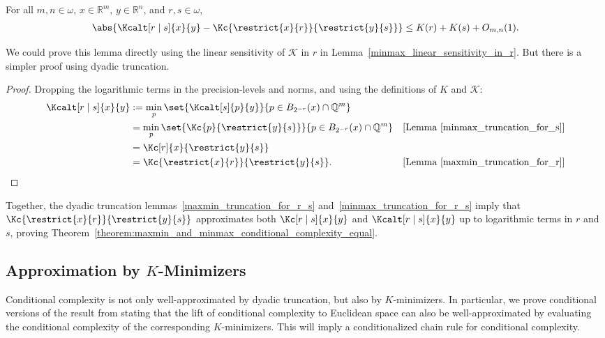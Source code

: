 \begin{lemma}
    \label{minmax_truncation_for_r_s}
    For all $m, n \in \omega$, $x \in \mathbb{R}^m$, $y \in \mathbb{R}^n$, and $r, s \in \omega$,
    \begin{align*}
        \abs{\Kcalt[r \mid s]{x}{y} - \Kc{\restrict{x}{r}}{\restrict{y}{s}}} \leq K(r) + K(s) + O_{m, n}(1).
    \end{align*}
\end{lemma}
We could prove this lemma directly using the linear sensitivity of $\mathcal{K}$ in $r$ in Lemma~\ref{minmax_linear_sensitivity_in_r}. But there is a simpler proof using dyadic truncation.
\begin{proof}
    Dropping the logarithmic terms in the precision-levels and norms, and using the definitions of $K$ and $\mathcal{K}$:
    \begin{align*}
        \Kcalt[r \mid s]{x}{y} &:= \min_p \set{\Kcalt[s]{p}{y}}{p \in B_{2^{-r}}(x) \cap \mathbb{Q}^m}\\
        &= \min_p \set{\Kc{p}{\restrict{y}{s}}}{p \in B_{2^{-r}}(x) \cap \mathbb{Q}^m} & [\text{Lemma~\ref{minmax_truncation_for_s}}]\\
        &= \Kc[r]{x}{\restrict{y}{s}} \\
        &= \Kc{\restrict{x}{r}}{\restrict{y}{s}}. & [\text{Lemma~\ref{maxmin_truncation_for_r}}]
    \end{align*}
\end{proof}

Together, the dyadic truncation lemmas~\ref{maxmin_truncation_for_r_s} and~\ref{minmax_truncation_for_r_s} imply that $\Kc{\restrict{x}{r}}{\restrict{y}{s}}$ approximates both $\Kc[r \mid s]{x}{y}$ and $\Kcalt[r \mid s]{x}{y}$ up to logarithmic terms in $r$ and $s$, proving Theorem~\ref{theorem:maxmin_and_minmax_conditional_complexity_equal}.

\subsection{Approximation by $K$-Minimizers}

Conditional complexity is not only well-approximated by dyadic truncation, but also by $K$-minimizers. In particular, we prove conditional versions of the result from \cite{CL14} stating that the lift of conditional complexity to Euclidean space can also be well-approximated by evaluating the conditional complexity of the corresponding $K$-minimizers. This will imply a conditionalized chain rule for conditional complexity. 


